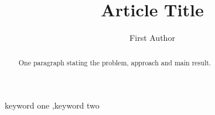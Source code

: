 \documentclass[preprint,12pt,a4paper]{elsarticle}
\begin{document}
\begin{frontmatter}
\title{Article Title}
\author{First Author}
\address{Institution, City, Country}
\begin{abstract}
One paragraph stating the problem, approach and main result.
\end{abstract}
\begin{keyword}
keyword one \sep keyword two
\end{keyword}
\end{frontmatter}




\end{document}
